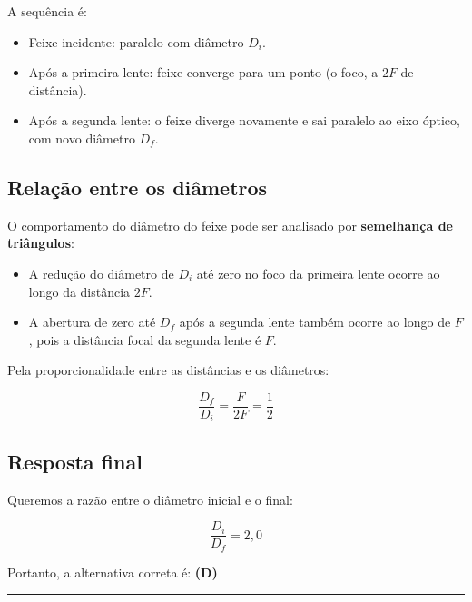 \documentclass[a4paper,12pt]{article}
\begin{document}
\begin{flushleft}
A sequência é:

\begin{itemize}
    \item Feixe incidente: paralelo com diâmetro \( D_i \).
    \item Após a primeira lente: feixe converge para um ponto (o foco, a \( 2F \) de distância).
    \item Após a segunda lente: o feixe diverge novamente e sai paralelo ao eixo óptico, com novo diâmetro \( D_f \).
\end{itemize}

\subsection*{Relação entre os diâmetros}

O comportamento do diâmetro do feixe pode ser analisado por \textbf{semelhança de triângulos}:

\begin{itemize}
    \item A redução do diâmetro de \( D_i \) até zero no foco da primeira lente ocorre ao longo da distância \( 2F \).
    \item A abertura de zero até \( D_f \) após a segunda lente também ocorre ao longo de \( F \), pois a distância focal da segunda lente é \( F \).
\end{itemize}

Pela proporcionalidade entre as distâncias e os diâmetros:

\begin{equation}
\frac{D_f}{D_i} = \frac{F}{2F} = \frac{1}{2}
\end{equation}

\subsection*{Resposta final}

Queremos a razão entre o diâmetro inicial e o final:

\begin{equation}
\boxed{
\frac{D_i}{D_f} = 2,0
}
\end{equation}

Portanto, a alternativa correta é: \textbf{\colorbox{green!50}{(D)}}

\end{flushleft}

\noindent\rule{\linewidth}{0.6pt}\\
\end{document}

